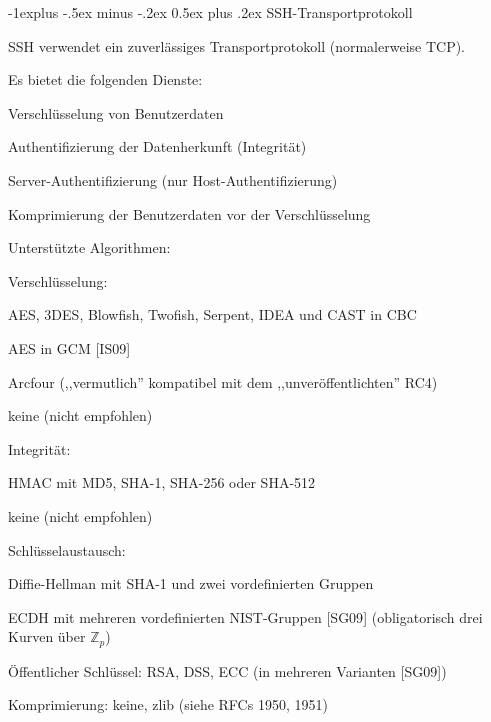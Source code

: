 \documentclass[a4paper]{article}
\makeatletter
\renewcommand{\subsection}{\@startsection{subsection}{2}{0mm}%
 {-1explus -.5ex minus -.2ex}%
 {0.5ex plus .2ex}%
 {\normalfont\normalsize\bfseries}}
\makeatother
\begin{document}
\begin{multicols}{3}
\begin{itemize*}
            \subsection{SSH-Transportprotokoll}
            \begin{itemize*}
                  \item       SSH verwendet ein zuverlässiges Transportprotokoll (normalerweise
                  TCP).
                  \item       Es bietet die folgenden Dienste:
                  \begin{itemize*}
                        \item Verschlüsselung von Benutzerdaten
                        \item Authentifizierung der Datenherkunft (Integrität)
                        \item Server-Authentifizierung (nur Host-Authentifizierung)
                        \item Komprimierung der Benutzerdaten vor der Verschlüsselung
                  \end{itemize*}
                  \item       Unterstützte Algorithmen:
                  \begin{itemize*}
                        \item Verschlüsselung:
                        \begin{itemize*} \item AES, 3DES, Blowfish, Twofish, Serpent, IDEA und CAST in CBC \item AES in GCM {[}IS09{]} \item Arcfour (,,vermutlich'' kompatibel mit dem ,,unveröffentlichten'' RC4) \item keine (nicht empfohlen) \end{itemize*}
                        \item Integrität:
                        \begin{itemize*} \item HMAC mit MD5, SHA-1, SHA-256 oder SHA-512 \item keine (nicht empfohlen) \end{itemize*}
                        \item Schlüsselaustausch:
                        \begin{itemize*} \item Diffie-Hellman mit SHA-1 und zwei vordefinierten Gruppen \item ECDH mit mehreren vordefinierten NIST-Gruppen {[}SG09{]} (obligatorisch drei Kurven über $\mathbb{Z}_p$) \item Öffentlicher Schlüssel: RSA, DSS, ECC (in mehreren Varianten {[}SG09{]}) \end{itemize*}
                        \item Komprimierung: keine, zlib (siehe RFCs 1950, 1951)
                  \end{itemize*}
            \end{itemize*}


\end{itemize*}
\end{multicols}
\end{document}
